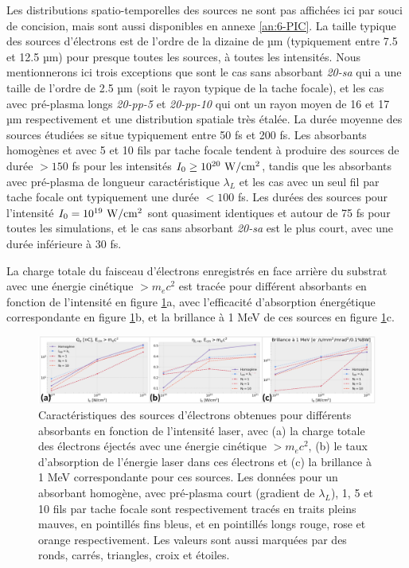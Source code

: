 \begin{refsection}
Les distributions spatio-temporelles des sources ne sont pas affichées ici par souci de concision, mais sont aussi disponibles en annexe \ref{an:6-PIC}.
La taille typique des sources d'électrons est de l'ordre de la dizaine de µm (typiquement entre 7.5 et 12.5 µm) pour presque toutes les sources, à toutes les intensités. Nous mentionnerons ici trois exceptions que sont le cas sans absorbant \textit{20-sa} qui a une taille de l'ordre de 2.5 µm (soit le rayon typique de la tache focale), et les cas avec pré-plasma longs \textit{20-pp-5} et \textit{20-pp-10} qui ont un rayon moyen de 16 et 17 µm respectivement et une distribution spatiale très étalée. La durée moyenne des sources étudiées se situe typiquement entre 50 fs et 200 fs. Les absorbants homogènes et avec 5 et 10 fils par tache focale tendent à produire des sources de durée $>150$ fs pour les intensités $I_0 \ge 10^{20} ~ \rm W/cm^2$, tandis que les absorbants avec pré-plasma de longueur caractéristique $\lambda_L$ et les cas avec un seul fil par tache focale ont typiquement une durée $<100$ fs. Les durées des sources pour l'intensité $I_0 = 10^{19} ~ \rm W/cm^2$ sont quasiment identiques et autour de 75 fs pour toutes les simulations, et le cas sans absorbant \textit{20-sa} est le plus court, avec une durée inférieure à 30 fs.

La charge totale du faisceau d'électrons enregistrés en face arrière du substrat avec une énergie cinétique $>m_e c^2$ est tracée pour différent absorbants en fonction de l'intensité en figure \ref{fig:62-Qe_etae_brillance}a, avec l'efficacité d'absorption énergétique correspondante en figure \ref{fig:62-Qe_etae_brillance}b, et la brillance à 1 MeV de ces sources en figure \ref{fig:62-Qe_etae_brillance}c.

\begin{figure}[hbtp]
	\centering
	\includegraphics[width=\linewidth]{6-opti_numerique/Qe_etae_brillance_electrons.png}
	\caption{Caractéristiques des sources d'électrons obtenues pour différents absorbants en fonction de l'intensité laser, avec (a) la charge totale des électrons éjectés avec une énergie cinétique $>m_ec^2$, (b) le taux d'absorption de l'énergie laser dans ces électrons et (c) la brillance à 1 MeV correspondante pour ces sources. Les données pour un absorbant homogène, avec pré-plasma court (gradient de $\lambda_L$), 1, 5 et 10 fils par tache focale sont respectivement tracés en traits pleins mauves, en pointillés fins bleus, et en pointillés longs rouge, rose et orange respectivement. Les valeurs sont aussi marquées par des ronds, carrés, triangles, croix et étoiles.}
	\label{fig:62-Qe_etae_brillance}
\end{figure}


\end{refsection}
